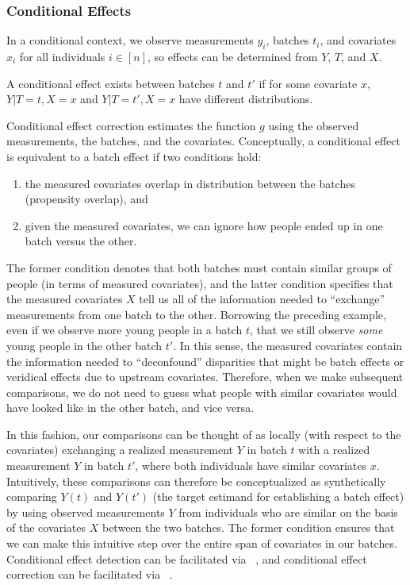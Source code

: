 {{\subsubsection{Conditional Effects}

In a conditional context, we observe measurements $y_i$, batches $t_i$, and covariates $x_i$ for all individuals $i \in [n]$, so effects can be determined from $Y$, $T$, and $X$.

\begin{flushleft}\begin{definition}
A conditional effect exists between batches $t$ and $t'$ if for some covariate $x$, $Y | T = t, X = x$ and $Y | T = t', X = x$ have different distributions.
\label{def:ass_site_effect_informal}
\end{definition}
\end{flushleft}

Conditional effect correction estimates the function $g$ using the observed measurements, the batches, and the covariates. Conceptually, a conditional effect is equivalent to a batch effect if two conditions hold:
\begin{enumerate}[leftmargin=*]
    \item  the measured covariates overlap in distribution between the batches (propensity overlap), and
    \item given the measured covariates, we can ignore how people ended up in one batch versus the other.
\end{enumerate}

The former condition denotes that both batches must contain similar groups of people (in terms of measured covariates), and the latter condition specifies that the measured covariates $X$ tell us all of the information needed to ``exchange'' measurements from one batch to the other. Borrowing the preceding example, even if we observe more young people in a batch $t$, that we still observe \textit{some} young people in the other batch $t'$. In this sense, the measured covariates contain the information needed to ``deconfound'' disparities that might be batch effects or veridical effects due to upstream covariates. Therefore, when we make subsequent comparisons, we do not need to guess what people with similar covariates would have looked like in the other batch, and vice versa.

In this fashion, our comparisons can be thought of as locally (with respect to the covariates) exchanging a realized measurement $Y$ in batch $t$ with a realized measurement $Y$ in batch $t'$, where both individuals have similar covariates $x$. Intuitively, these comparisons can therefore be conceptualized as synthetically comparing $Y(t)$ and $Y(t')$ (the target estimand for establishing a batch effect) by using observed measurements $Y$ from individuals who are similar on the basis of the covariates $X$ between the two batches. The former condition ensures that we can make this intuitive step over the entire span of covariates in our batches. Conditional effect detection can be facilitated via \cdcorr~\cite{Wang2015}, and conditional effect correction can be facilitated via \ccombat~\cite{Johnson2007Jan}.

}}
